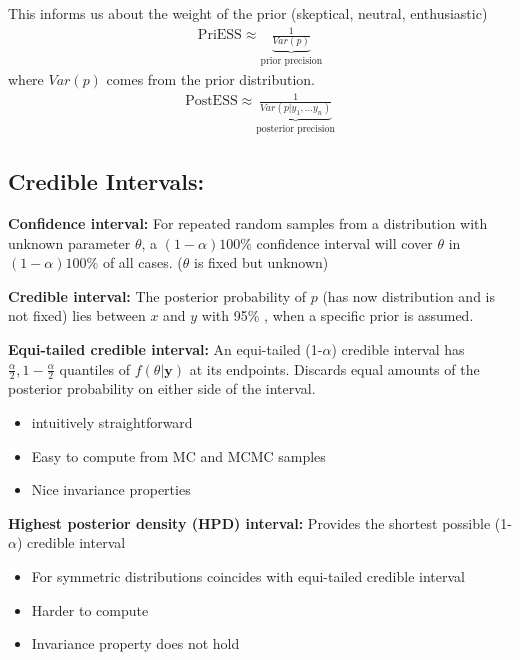 \documentclass{article}\usepackage[]{graphicx}\usepackage[]{xcolor}
\begin{document}
\begin{multicols*}{2}
This informs us about the weight of the prior (skeptical, neutral, enthusiastic)
\begin{align*}
\text{PriESS}\approx\underbrace{\frac{1}{Var(p)}}_{\text{prior precision}}
\end{align*}
where $Var(p)$ comes from the prior distribution.
\begin{align*}
\text{PostESS}\approx\underbrace{\frac{1}{Var(p|y_1,...y_n)}}_{\text{posterior precision}}
\end{align*}


\subsection{Credible Intervals:}
\textbf{Confidence interval:}\newline
For repeated random samples from a distribution with unknown parameter $\theta$, a $(1-\alpha)100\%$ confidence interval will cover $\theta$ in $(1-\alpha)100\%$ of all cases. ($\theta$ is fixed but unknown)

\textbf{Credible interval:}\newline
The posterior probability of $p$ (has now distribution and is not fixed) lies between $x$ and $y$ with 95\% , when a specific prior is assumed.

\textbf{Equi-tailed credible interval:}\newline
An equi-tailed (1-$\alpha$) credible interval has $\frac{\alpha}{2},1-\frac{\alpha}{2}$ quantiles of $f(\theta|\boldsymbol{y})$ at its endpoints. Discards equal amounts of the posterior probability on either side of the interval.
\begin{itemize}
\item intuitively straightforward
\item Easy to compute from MC and MCMC samples
\item Nice invariance properties
\end{itemize}

\textbf{Highest posterior density (HPD) interval:}\newline
Provides the shortest possible (1-$\alpha$) credible interval
\begin{itemize}
\item For symmetric distributions coincides with equi-tailed credible interval
\item Harder to compute
\item Invariance property does not hold
\end{itemize}

\end{multicols*}
\end{document}
